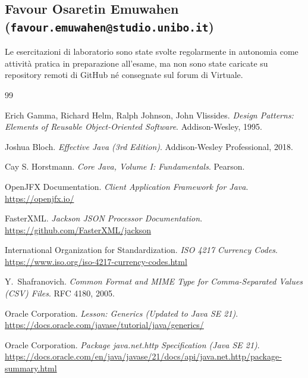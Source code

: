 \documentclass[11pt,a4paper,openright]{report}
\begin{document}
\subsection*{Favour Osaretin Emuwahen (\texttt{favour.emuwahen@studio.unibo.it})}
\noindent
Le esercitazioni di laboratorio sono state svolte regolarmente in autonomia come attivit\`a pratica in preparazione all'esame, ma non sono state caricate su repository remoti di GitHub n\'e consegnate sul forum di Virtuale.


\begin{thebibliography}{99}

  Erich Gamma, Richard Helm, Ralph Johnson, John Vlissides.
  \newblock \emph{Design Patterns: Elements of Reusable Object-Oriented Software}.
  \newblock Addison-Wesley, 1995.

  Joshua Bloch.
  \newblock \emph{Effective Java (3rd Edition)}.
  \newblock Addison-Wesley Professional, 2018.

Cay S. Horstmann.
\newblock \emph{Core Java, Volume I: Fundamentals}.
\newblock Pearson.

OpenJFX Documentation.
\newblock \emph{Client Application Framework for Java}.
\newblock \url{https://openjfx.io/}

  FasterXML.
  \newblock \emph{Jackson JSON Processor Documentation}.
  \newblock \url{https://github.com/FasterXML/jackson}

  International Organization for Standardization.
  \newblock \emph{ISO 4217 Currency Codes}.
  \newblock \url{https://www.iso.org/iso-4217-currency-codes.html}

  Y.~Shafranovich.
  \newblock \emph{Common Format and MIME Type for Comma-Separated Values (CSV) Files}.
  \newblock RFC 4180, 2005.

  Oracle Corporation.
  \newblock \emph{Lesson: Generics (Updated to Java SE 21)}.
  \newblock \url{https://docs.oracle.com/javase/tutorial/java/generics/}

  Oracle Corporation.
  \newblock \emph{Package java.net.http Specification (Java SE 21)}.
  \newblock \url{https://docs.oracle.com/en/java/javase/21/docs/api/java.net.http/package-summary.html}


\end{thebibliography}
\end{document}
